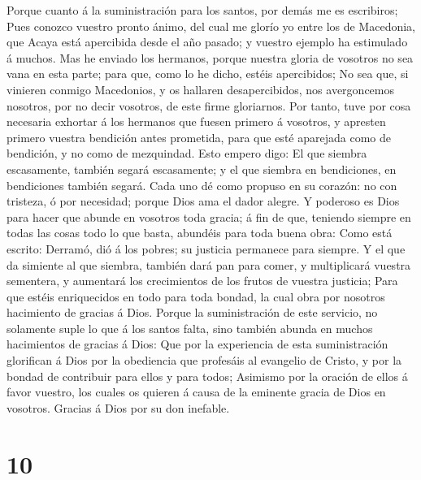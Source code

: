  Porque cuanto á la suministración para los santos, por
demás me es escribiros;  Pues conozco vuestro pronto ánimo,
del cual me glorío yo entre los de Macedonia, que Acaya está apercibida
desde el año pasado; y vuestro ejemplo ha estimulado á muchos.
 Mas he enviado los hermanos, porque nuestra gloria de
vosotros no sea vana en esta parte; para que, como lo he dicho, estéis
apercibidos;  No sea que, si vinieren conmigo Macedonios, y
os hallaren desapercibidos, nos avergoncemos nosotros, por no decir
vosotros, de este firme gloriarnos.  Por tanto, tuve por
cosa necesaria exhortar á los hermanos que fuesen primero á vosotros, y
apresten primero vuestra bendición antes prometida, para que esté
aparejada como de bendición, y no como de mezquindad.  Esto
empero digo: El que siembra escasamente, también segará escasamente; y
el que siembra en bendiciones, en bendiciones también segará.
 Cada uno dé como propuso en su corazón: no con tristeza, ó
por necesidad; porque Dios ama el dador alegre.  Y poderoso
es Dios para hacer que abunde en vosotros toda gracia; á fin de que,
teniendo siempre en todas las cosas todo lo que basta, abundéis para
toda buena obra:  Como está escrito: Derramó, dió á los
pobres; su justicia permanece para siempre.  Y el que da
simiente al que siembra, también dará pan para comer, y multiplicará
vuestra sementera, y aumentará los crecimientos de los frutos de vuestra
justicia;  Para que estéis enriquecidos en todo para toda
bondad, la cual obra por nosotros hacimiento de gracias á Dios.
 Porque la suministración de este servicio, no solamente
suple lo que á los santos falta, sino también abunda en muchos
hacimientos de gracias á Dios:  Que por la experiencia de
esta suministración glorifican á Dios por la obediencia que profesáis al
evangelio de Cristo, y por la bondad de contribuir para ellos y para
todos;  Asimismo por la oración de ellos á favor vuestro,
los cuales os quieren á causa de la eminente gracia de Dios en vosotros.
 Gracias á Dios por su don inefable.

\hypertarget{section-9}{%
\section{10}\label{section-9}}

